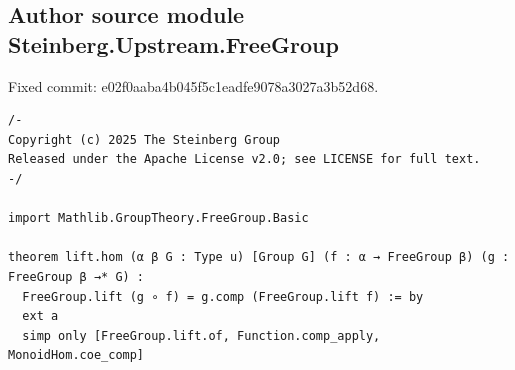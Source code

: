 \subsection*{Author source module Steinberg.Upstream.FreeGroup}
\noindent Fixed commit: e02f0aaba4b045f5c1eadfe9078a3027a3b52d68.
\begin{Verbatim}
/-
Copyright (c) 2025 The Steinberg Group
Released under the Apache License v2.0; see LICENSE for full text.
-/

import Mathlib.GroupTheory.FreeGroup.Basic

theorem lift.hom (α β G : Type u) [Group G] (f : α → FreeGroup β) (g : FreeGroup β →* G) :
  FreeGroup.lift (g ∘ f) = g.comp (FreeGroup.lift f) := by
  ext a
  simp only [FreeGroup.lift.of, Function.comp_apply, MonoidHom.coe_comp]
\end{Verbatim}
